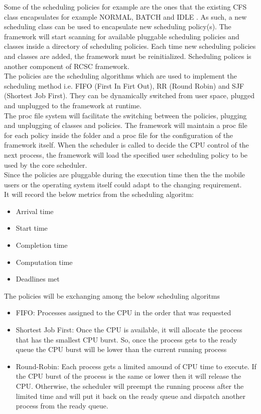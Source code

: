\documentclass[conference]{IEEEtran}
\begin{document}
Some of the scheduling policies for example are the ones that the existing CFS class encapsulates for example NORMAL, BATCH and IDLE \cite{SchLnx}. 
As such, a new scheduling class can be used to encapsulate new scheduling policy(s). The framework will start scanning for available pluggable scheduling policies  and classes inside a directory of scheduling policies. Each time new scheduling policies and classes are added, the framework must be reinitialized. Scheduling polices is another component of RCSC framework. \\
The policies are the scheduling algorithms which are used to implement the scheduling method i.e. FIFO (First In Firt Out), RR (Round Robin) and SJF (Shortest Job First). They can be dynamically switched from user space, plugged and unplugged to the framework at runtime.  \cite{ALMA01} \\
The proc file system will facilitate the switching between the policies, plugging and unplugging of classes and policies. The framework will maintain a proc file for each policy inside the folder and a proc file for the configuration of the framework itself. When the scheduler is called to decide the CPU control of the next process, the framework will load the specified user scheduling policy to be used by the core scheduler.\\
Since the policies are pluggable during the execution time then the the mobile users or the operating system itself could adapt to the changing requirement.\\

It will record the below metrics from the scheduling algoritm:
\begin{itemize}
\item Arrival time
\item Start time
\item Completion time
\item Computation time
\item Deadlines met
\end{itemize}

The policies will be exchanging among the below scheduling algoritms \cite{GITAM01}
\begin{itemize}
\item FIFO: Processes assigned to the CPU in the order that was requested
\item Shortest Job First: Once the CPU is available, it will allocate the process that has the smallest CPU burst. So, once the process gets to the ready queue the CPU burst will be lower than the current running process 
\item Round-Robin: Each process gets a limited amound of CPU time to execute. If the CPU burst of the process is the same or lower then it will release the CPU. Otherwise, the scheduler will preempt the running process after the limited time and will put it back on the ready queue and dispatch another process from the ready queue.
\end{itemize}
\end{document}
